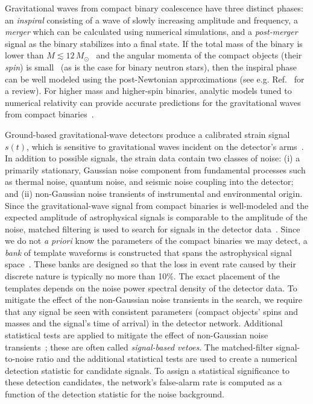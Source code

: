 Gravitational waves from compact binary coalescence have three distinct
phases: an \emph{inspiral} consisting of a wave of slowly increasing amplitude
and frequency, a \emph{merger} which can be calculated using numerical
simulations, and a \emph{post-merger} signal as the binary stabilizes into a final
state. If the total mass of the binary is lower than $M \lesssim 12\,
M_\odot$~\cite{Buonanno:2009zt,Brown:2012nn}
and the angular momenta of the compact objects (their \emph{spin}) is
small~\cite{Nitz:2013mxa,Kumar:2015tha}
(as is the case for binary neutron stars), then the inspiral phase can be 
well modeled using the post-Newtonian approximations (see e.g.
Ref.~\cite{Blanchet:2013haa} for a review).  For higher mass and higher-spin
binaries, analytic models tuned to numerical relativity can provide accurate
predictions for the gravitational waves from compact 
binaries~\cite{Buonanno:1998gg,Pan:2009wj,Damour:2012ky,Taracchini:2013rva,Damour:2014sva}. 

Ground-based gravitational-wave detectors produce a calibrated strain signal
$s(t)$, which is sensitive to gravitational waves incident on the detector's
arms~\cite{Abadie:2010px}. In addition to possible signals, the strain data contain two classes of
noise: (i) a primarily stationary, Gaussian noise component from fundamental
processes such as thermal noise, quantum noise, and seismic noise coupling
into the detector; and (ii) non-Gaussian noise transients of instrumental and
environmental origin. Since the gravitational-wave signal from compact
binaries is well-modeled and the expected amplitude of astrophysical signals is
comparable to the amplitude of the noise,
matched filtering is used to search for signals in the detector data~\cite{Allen:2005fk}.  Since
we do not \emph{a priori} know the parameters of the compact
binaries we may detect, a \emph{bank} of template waveforms is constructed that spans the astrophysical
signal space~\cite{Sathyaprakash:1991mt,Dhurandhar:1992mw,Owen:1995tm,Owen:1998dk,Babak:2006ty,Cokelaer:2007kx,Brown:2012qf,Keppel:2013yia,Keppel:2013uma}. These banks are designed so that the loss in event rate caused by
their discrete nature is typically no more than 10\%. The exact placement of the
templates depends on the noise power spectral density of the detector data. To
mitigate the effect of the non-Gaussian noise transients in the search, we
require that any signal be seen with consistent parameters (compact objects'
spins and masses and the signal's time of arrival) in the detector network. Additional
statistical tests are applied to mitigate the effect of non-Gaussian
noise transients~\cite{Allen:2004gu}; these are often called \emph{signal-based vetoes}. The 
matched-filter signal-to-noise ratio and the additional statistical tests are used to
create a numerical detection statistic for candidate signals. To assign a
statistical significance to these detection candidates, the network's false-alarm rate is computed as a function of the detection statistic for the
noise background.


